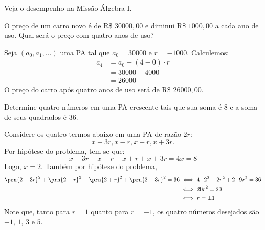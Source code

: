 \begin{onlineact}
\end{onlineact}

\begin{onlineact}
\end{onlineact}
%
\noindent Veja o desempenho na Missão Álgebra I.

\begin{example} 
O preço de um carro novo é de R\$ $30000{,}00$ e diminui R\$ $1000{,}00$ a cada ano de uso. Qual será o preço com quatro anos de uso?
\end{example}

\begin{solution}
Seja $(a_0, a_1, \dots)$ uma PA tal que $a_0 = 30000$ e $r = -1000$. Calculemos:
%
\begin{align*}
a_4 &= a_0+(4-0)\cdot r\\ &=30000-4000 \\ &= 26000
\end{align*}
%
O preço do carro após quatro anos de uso será de R\$ $26000{,}00$.
\end{solution}

\begin{example}
Determine quatro números em uma PA crescente tais que sua soma é 8 e a soma de seus quadrados é 36.
\end{example}

\begin{solution}
Considere os quatro termos abaixo em uma PA de razão $2r$:
%
\begin{equation*}
x-3r, x-r, x+r, x+3r.
\end{equation*}
%
Por hipótese do problema, tem-se que:
%
\begin{equation*}
x-3r+x-r+x+r+x+3r = 4x = 8 
\end{equation*}
%
Logo, $x=2$. Também por hipótese do problema, 
%
\begin{align*}
\prn{2-3r}^2 + \prn{2-r}^2 + \prn{2+r}^2 + \prn{2+3r}^2 = 36 & \iff 4 \cdot 2^2 + 2r^2 + 2\cdot 9r^2 =  36 \\ & \iff 20r^2 = 20 \\ & \iff r = \pm 1
\end{align*}
%
Note que, tanto para $r=1$ quanto para $r=-1$, os quatro números desejados são $-1$, $1$, $3$ e $5$.
\end{solution}

